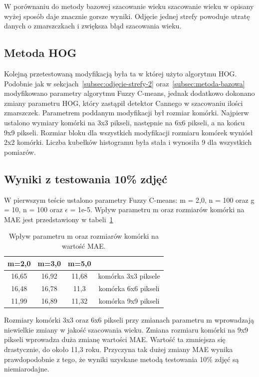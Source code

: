 \documentclass[a4paper,twoside,12pt]{book}
\begin{document}
    W porównaniu do metody bazowej szacowanie wieku szacowanie wieku w opisany wyżej sposób daje znacznie
    gorsze wyniki. Odjęcie jednej strefy powoduje utratę
    danych o zmarszczkach i zwiększa błąd szacowania wieku.

    \subsection{Metoda HOG}\label{subsec:metoda-hog}
    Kolejną przetestowaną modyfikacją była ta w której użyto algorytmu HOG.
    Podobnie jak w sekcjach~\ref{subsec:odjęcie-strefy-2} oraz~\ref{subsec:metoda-bazowa} modyfikowano parametry
    algorytmu Fuzzy C-means, jednak dodatkowo dokonano zmiany parametru HOG, który zastąpił detektor Cannego w
    szacowaniu ilości zmarszczek.
    Parametrem poddanym modyfikacji był
    rozmiar komórki. Najpierw ustalono wymiary komórki na 3x3 pikseli, następnie na 6x6 pikseli, a na końcu 9x9
    pikseli.
    Rozmiar bloku dla wszystkich modyfikacji rozmiaru komórek wyniósł
    2x2 komórki. Liczba kubełków histogramu była stała i wynosiła 9 dla wszystkich pomiarów.
    \subsection*{Wyniki z testowania 10\% zdjęć}
    W pierwszym teście ustalono parametry Fuzzy C-means: m = 2,0, n = 100 oraz g = 10, n = 100
    oraz $\epsilon$ = 1e-5.
    Wpływ parametru m oraz rozmiarów komórki na MAE jest przedstawiony w tabeli~\ref{tab.hog}
    \begin{table}[]
        \centering
        \caption{Wpływ parametru m oraz rozmiarów komórki na wartość MAE.}
        \begin{tabular}{|c|c|c|c|}
            \hline
            m=2,0 & m=3,0 & m=5,0 &                     \\ \hline
            16,65 & 16,92 & 11,68 & komórka 3x3 piksele \\ \hline
            16,48 & 16,78 & 11,3 & komórka 6x6 pikseli \\ \hline
            11,99 & 16,89 & 11,32 & komórka 9x9 pikseli \\ \hline
        \end{tabular}
        \label{tab.hog}
    \end{table}
    Rozmiary komórki 3x3 oraz 6x6 pikseli przy zmianach parametru m wprowadzają niewielkie zmiany w jakość
    szacowania wieku. Zmiana rozmiaru komórki na 9x9 pikseli wprowadza duża zmianę wartości MAE. Wartość ta
    zmniejsza się drastycznie, do około 11,3 roku. Przyczyna tak dużej zmiany MAE wynika prawdopodobnie z tego, że
    wyniki uzyskane metodą testowania 10\% zdjęć są niemiarodajne.
\end{document}
